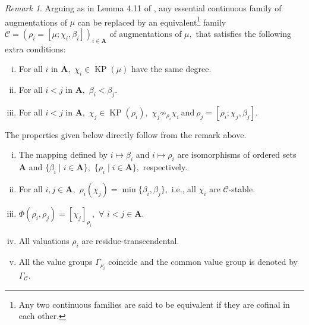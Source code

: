 \documentclass[11pt]{amsart}
\theoremstyle{definition}
\theoremstyle{remark}
\newtheorem{remark}[theorem]{Remark}
\numberwithin{equation}{section}
\begin{document}
\begin{remark}\label{cfr}
	 Arguing as in Lemma 4.11 of \cite{Ma2}, any essential continuous family of augmentations of $\mu$ can be replaced by an equivalent\footnote{ Any two continuous families are said to be equivalent if they are cofinal in each other.} family $\mathcal{C}=(\rho_i=[\mu;\chi_i,\beta_i])_{i\in\mathbf{A}}$ of augmentations of $\mu,$ that satisfies the following extra conditions:
\begin{enumerate}[(i)]
	\item For all $i$ in $\mathbf{A},$ $\chi_i\in \operatorname{KP}(\mu)$ have the same degree.
	\item For all $i<j$ in $\mathbf{A},$ $\beta_i<\beta_j.$
	\item For all $i<j$ in $\mathbf{A},$ $\chi_j\in\operatorname{KP}(\rho_i),$ 
	$\chi_j\not\sim_{\rho_i}\chi_i~\text{and}~ \rho_j=[\rho_i;\chi_j,\beta_j].$
\end{enumerate}	
\end{remark}
	The properties given below directly follow from the remark above.
	\begin{enumerate}[(i)]
		\item The mapping defined by $i\mapsto\beta_i$ and $i\mapsto\rho_i$ are isomorphisms of ordered sets  $\mathbf{A}$ and $\{\beta_i\mid i\in\mathbf{A}\},$ $\{\rho_i\mid i\in\mathbf{A}\},$ respectively.
		\item For all $i, j\in\mathbf{A},$ $\rho_i(\chi_j)=\min\{\beta_i,\beta_j\},$ i.e., all $\chi_i$ are $\mathcal{C}$-stable.
		\item $\Phi(\rho_i,\rho_j)=[\chi_j]_{\rho_i},$ $\forall$ $i<j\in\mathbf{A}.$
		\item All valuations $\rho_i$ are residue-transcendental.
		\item All the value groups $\Gamma_{\rho_i}$ coincide and  the common value group is denoted by $\Gamma_{\mathcal{C}}.$ 
	\end{enumerate}


\end{document}

